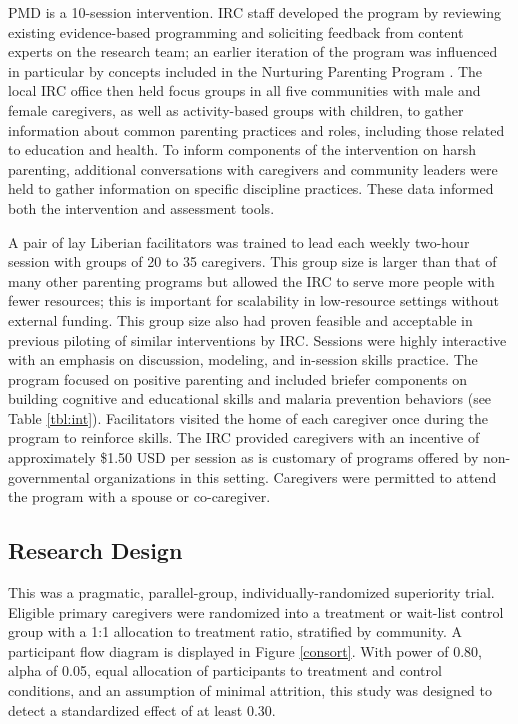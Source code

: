 \documentclass[12pt,authoryear]{elsarticle}\usepackage{knitr}
\begin{document}
PMD is a 10-session intervention. IRC staff developed the program by reviewing existing evidence-based programming and soliciting feedback from content experts on the research team; an earlier iteration of the program was influenced in particular by concepts included in the Nurturing Parenting Program \citep{Bavolek:1983}. The local IRC office then held focus groups in all five communities with male and female caregivers, as well as activity-based groups with children, to gather information about common parenting practices and roles, including those related to education and health. To inform components of the intervention on harsh parenting, additional conversations with caregivers and community leaders were held to gather information on specific discipline practices. These data informed both the intervention and assessment tools. 

A pair of lay Liberian facilitators was trained to lead each weekly two-hour session with groups of 20 to 35 caregivers. This group size is larger than that of many other parenting programs but allowed the IRC to serve more people with fewer resources; this is important for scalability in low-resource settings without external funding. This group size also had proven feasible and acceptable in previous piloting of similar interventions by IRC. Sessions were highly interactive with an emphasis on discussion, modeling, and in-session skills practice. The program focused on positive parenting and included briefer components on building cognitive and educational skills and malaria prevention behaviors (see Table \ref{tbl:int}). Facilitators visited the home of each caregiver once during the program to reinforce skills. The IRC provided caregivers with an incentive of approximately \$1.50 USD per session as is customary of programs offered by non-governmental organizations in this setting. Caregivers were permitted to attend the program with a spouse or co-caregiver.


  
\subsection*{Research Design}

This was a pragmatic, parallel-group, individually-randomized superiority trial. Eligible primary caregivers were randomized into a treatment or wait-list control group with a 1:1 allocation to treatment ratio, stratified by community. A participant flow diagram is displayed in Figure \ref{consort}. With power of 0.80, alpha of 0.05, equal allocation of participants to treatment and control conditions, and an assumption of minimal attrition, this study was designed to detect a standardized effect of at least 0.30. 
\end{document}

